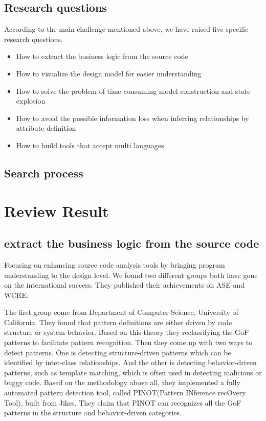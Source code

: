 \documentclass[acmsmall]{acmart}
\begin{document}
\subsection{Research questions}
According to the main challenge mentioned above, we have raised five specific research questions.
\begin{itemize}
\item  How to extract the business logic from the source code
\item  How to visualize the design model for easier understanding
\item  How to solve the problem of time-consuming model construction and state explosion
\item  How to avoid the possible information loss when inferring relationships by attribute definition
\item  How to build tools that accept multi languages
\end{itemize}

\subsection{Search process}


\section{Review Result}

\subsection{extract the business logic from the source code}
Focusing on enhancing source code analysis tools by bringing program understanding to the design level. We found two different groups both have gone on the international success. They published their achievements on ASE and WCRE.

The first group come from Department of Computer Science, University of California\cite{2006Reverse}. They found that pattern definitions are either driven by code structure or system behavior. Based on this theory they reclassifying the GoF patterns to facilitate pattern recognition. Then they come up with two ways to detect patterns. One is detecting structure-driven patterns which can be identified by inter-class relationships. And the other is detecting behavior-driven patterns, such as template matching, which is often used in detecting malicious or buggy code. Based on the methodology above all, they implemented a fully automated pattern detection tool, called PINOT(Pattern INference recOvery Tool), built from Jikes. They claim that PINOT can recognizes all the GoF patterns in the structure and behavior-driven categories. 
\end{document}
